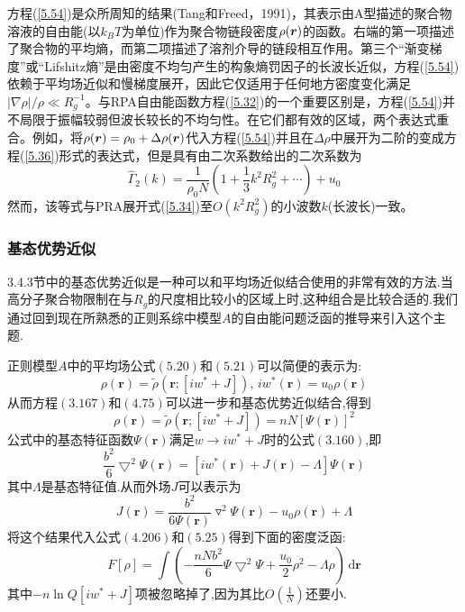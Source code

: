 方程(\ref{5.54})是众所周知的结果(Tang和Freed，1991)，其表示由A型描述的聚合物溶液的自由能(以$k_BT$为单位)作为聚合物链段密度$\rho(\bm{r})$的函数。右端的第一项描述了聚合物的平均熵，而第二项描述了溶剂介导的链段相互作用。第三个“渐变梯度”或“Lifshitz熵”是由密度不均匀产生的构象熵罚因子的长波长近似，方程(\ref{5.54})依赖于平均场近似和慢梯度展开，因此它仅适用于任何地方密度变化满足$\left|\nabla\rho\right|/\rho\ll R_g^{-1}$。与RPA自由能函数方程(\ref{5.32})的一个重要区别是，方程(\ref{5.54})并不局限于振幅较弱但波长较长的不均匀性。在它们都有效的区域，两个表达式重合。例如，将$\rho(\bm{r})=\rho_0+\Delta\rho(\bm{r})$代入方程(\ref{5.54})并且在$\Delta\rho$中展开为二阶的变成方程(\ref{5.36})形式的表达式，但是具有由二次系数给出的二次系数为
\begin{equation}
\hat{\Gamma}_2(k)=\frac{1}{\rho_0N}\left(1+\frac{1}{3}k^2R_g^2+\cdots\right)+u_0
\end{equation}
然而，该等式与PRA展开式(\ref{5.34})至$O(k^2R_g^2)$的小波数$k$(长波长)一致。

\subsubsection{基态优势近似}
3.4.3节中的基态优势近似是一种可以和平均场近似结合使用的非常有效的方法.当高分子聚合物限制在与$R_g$的尺度相比较小的区域上时,这种组合是比较合适的.我们通过回到现在所熟悉的正则系综中模型$A$的自由能问题泛函的推导来引入这个主题.

正则模型$A$中的平均场公式$(5.20)$和$(5.21)$可以简便的表示为:
\begin{equation}
\rho(\mathbf{r}) = \tilde{\rho}(\mathbf{r};[iw^*+J]),\,iw^*(\mathbf{r}) = u_0 \rho(\mathbf{r})
\end{equation}
从而方程$(3.167)$和$(4.75)$可以进一步和基态优势近似结合,得到
\begin{equation}
\rho(\mathbf{r}) = \tilde{\rho}(\mathbf{r};[iw^*+J]) = nN[\Psi(\mathbf{r})]^2
\end{equation}
公式中的基态特征函数$\Psi(\mathbf{r})$满足$w \rightarrow iw^*+J$时的公式$(3.160)$,即
\begin{equation}
\frac{b^2}{6} {\bigtriangledown}^2 \Psi(\mathbf{r}) = [iw^*(\mathbf{r})+J(\mathbf{r})-\Lambda]\Psi(\mathbf{r})
\end{equation}
其中$\Lambda$是基态特征值.从而外场$J$可以表示为
\begin{equation}
J(\mathbf{r}) = \frac{b^2}{6 \Psi(\mathbf{r})} \triangledown^2 \Psi(\mathbf{r}) - u_0 \rho(\mathbf{r}) + \Lambda
\end{equation}
将这个结果代入公式$(4.206)$和$(5.25)$得到下面的密度泛函:
\begin{equation}
F[\rho] = \int (-\frac{nNb^2}{6}\Psi\bigtriangledown^2\Psi+\frac{u_0}{2}\rho^2-\Lambda\rho)\,\mathrm{d}\mathbf{r}
\end{equation}
其中$-n\ln Q[iw^*+J]$项被忽略掉了,因为其比$O(\frac{1}{N})$还要小.

